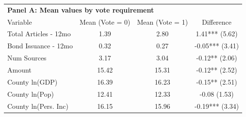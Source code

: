 \begin{table}[ht]
\centering
\begin{tabular*}{\textwidth}{@{\extracolsep{\fill}}lccc}
\multicolumn{4}{l}{\textbf{Panel A: Mean values by vote requirement}}\\

\addlinespace
  \hline
Variable & Mean (Vote = 0) & Mean (Vote = 1) & Difference \\ 
  \hline
Total Articles - 12mo & 1.39 & 2.80 & 1.41*** (5.62) \\ 
  Bond Issuance - 12mo & 0.32 & 0.27 & -0.05*** (3.41) \\ 
  Num Sources & 3.17 & 3.04 & -0.12** (2.06) \\ 
  Amount & 15.42 & 15.31 & -0.12** (2.52) \\ 
  County ln(GDP) & 16.39 & 16.23 & -0.15** (2.51) \\ 
  County ln(Pop) & 12.41 & 12.33 & -0.08 (1.53) \\ 
  County ln(Pers. Inc) & 16.15 & 15.96 & -0.19*** (3.34) \\ 
   \hline
\end{tabular*}
\end{table}
